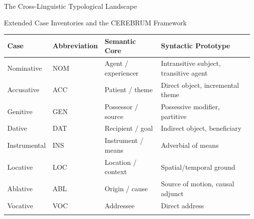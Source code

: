 \documentclass[
  ignorenonframetext,
]{beamer}
\newcounter{none} %
\begin{document}
\begin{frame}{The Cross-Linguistic Typological Landscape}
\begin{block}{Extended Case Inventories and the CEREBRUM Framework}
{\def\LTcaptype{none} %
\begin{longtable}[]{@{}
  >{\raggedright\arraybackslash}p{}
  >{\centering\arraybackslash}p{}
  >{\raggedright\arraybackslash}p{}
  >{\raggedright\arraybackslash}p{}@{}}
\toprule\noalign{}
\begin{minipage}[b]{\linewidth}\raggedright
Case
\end{minipage} & \begin{minipage}[b]{\linewidth}\centering
Abbreviation
\end{minipage} & \begin{minipage}[b]{\linewidth}\raggedright
Semantic Core
\end{minipage} & \begin{minipage}[b]{\linewidth}\raggedright
Syntactic Prototype
\end{minipage} \\
\midrule\noalign{}
\endhead
Nominative & NOM & Agent / experiencer & Intransitive subject,
transitive agent \\
Accusative & ACC & Patient / theme & Direct object, incremental theme \\
Genitive & GEN & Possessor / source & Possessive modifier, partitive \\
Dative & DAT & Recipient / goal & Indirect object, beneficiary \\
Instrumental & INS & Instrument / means & Adverbial of means \\
Locative & LOC & Location / context & Spatial/temporal ground \\
Ablative & ABL & Origin / cause & Source of motion, causal adjunct \\
Vocative & VOC & Addressee & Direct address \\
\bottomrule\noalign{}
\end{longtable}
}
\end{block}
\end{frame}
\end{document}
